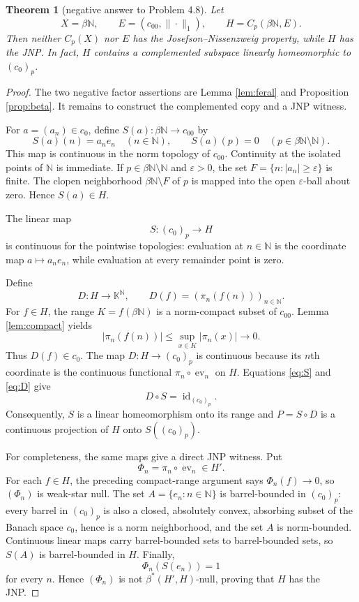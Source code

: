 \documentclass[11pt]{article}
\newtheorem{theorem}{Theorem}
\newcommand{\K}{\mathbb K}
\newcommand{\N}{\mathbb N}
\newcommand{\czerop}{(c_0)_p}
\begin{document}
\begin{theorem}[negative answer to Problem 4.8]\label{thm:main}
Let
\[
  X=\beta\N,\qquad E=(c_{00},\|\cdot\|_1),\qquad
  H=C_p(\beta\N,E).
\]
Then neither $C_p(X)$ nor $E$ has the Josefson--Nissenzweig property, while
$H$ has the JNP.  In fact, $H$ contains a complemented subspace linearly
homeomorphic to $\czerop$.
\end{theorem}

\begin{proof}
The two negative factor assertions are Lemma \ref{lem:feral} and Proposition
\ref{prop:beta}.  It remains to construct the complemented copy and a JNP
witness.

For $a=(a_n)\in c_0$, define $S(a):\beta\N\to c_{00}$ by
\begin{equation}\label{eq:S}
  S(a)(n)=a_ne_n\quad(n\in\N),
  \qquad S(a)(p)=0\quad(p\in\beta\N\setminus\N).
\end{equation}
This map is continuous in the norm topology of $c_{00}$.  Continuity at the
isolated points of $\N$ is immediate.  If $p\in\beta\N\setminus\N$ and
$\varepsilon>0$, the set
$F=\{n:|a_n|\geq\varepsilon\}$ is finite.  The clopen neighborhood
$\beta\N\setminus F$ of $p$ is mapped into the open $\varepsilon$-ball about
zero.  Hence $S(a)\in H$.

The linear map
\[
  S:\czerop\longrightarrow H
\]
is continuous for the pointwise topologies: evaluation at $n\in\N$ is the
coordinate map $a\mapsto a_ne_n$, while evaluation at every remainder point
is zero.

Define
\begin{equation}\label{eq:D}
  D:H\longrightarrow\K^{\N},
  \qquad D(f)=(\pi_n(f(n)))_{n\in\N}.
\end{equation}
For $f\in H$, the range $K=f(\beta\N)$ is a norm-compact subset of $c_{00}$.
Lemma \ref{lem:compact} yields
\[
  |\pi_n(f(n))|\leq\sup_{x\in K}|\pi_n(x)|\longrightarrow0.
\]
Thus $D(f)\in c_0$.  The map $D:H\to\czerop$ is continuous because its
$n$th coordinate is the continuous functional $\pi_n\circ\operatorname{ev}_n$
on $H$.  Equations \eqref{eq:S} and \eqref{eq:D} give
\[
  D\circ S=\operatorname{id}_{\czerop}.
\]
Consequently, $S$ is a linear homeomorphism onto its range and
$P=S\circ D$ is a continuous projection of $H$ onto $S(\czerop)$.

For completeness, the same maps give a direct JNP witness.  Put
\[
  \Phi_n=\pi_n\circ\operatorname{ev}_n\in H'.
\]
For each $f\in H$, the preceding compact-range argument says
$\Phi_n(f)\to0$, so $(\Phi_n)$ is weak-star null.  The set
$A=\{e_n:n\in\N\}$ is barrel-bounded in $\czerop$: every barrel in
$\czerop$ is also a closed, absolutely convex, absorbing subset of the
Banach space $c_0$, hence is a norm neighborhood, and the set $A$ is
norm-bounded.  Continuous linear maps carry barrel-bounded sets to
barrel-bounded sets, so $S(A)$ is barrel-bounded in $H$.  Finally,
\[
  \Phi_n(S(e_n))=1
\]
for every $n$.  Hence $(\Phi_n)$ is not $\beta^*(H',H)$-null, proving that
$H$ has the JNP.
\end{proof}
\end{document}
